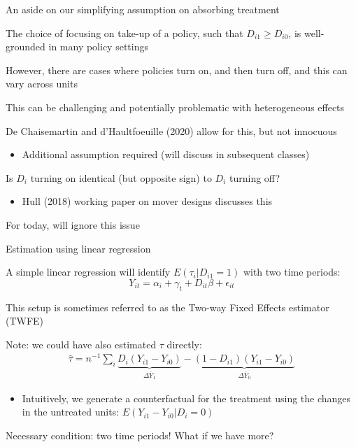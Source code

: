 \documentclass[notes,11pt, aspectratio=169]{beamer}
\newenvironment{wideitemize}{\itemize\addtolength{\itemsep}{10pt}}{\enditemize}
\begin{document}
\begin{frame}{An aside on our simplifying assumption on absorbing treatment}
	\begin{wideitemize}
		\item The choice of focusing on take-up of a policy, such that $D_{i1} \geq D_{i0}$, is well-grounded in many policy settings
		\item However, there are cases where policies turn on, and then turn off, and this can vary across units
		\item This can be challenging and potentially problematic with
		heterogeneous effects
		\item De Chaisemartin and d'Haultfoeuille (2020) allow for this, but not innocuous
		\begin{itemize}
			\item Additional assumption required (will discuss in subsequent classes)
		\end{itemize}
		\item Is $D_{i}$ turning on identical (but opposite sign) to $D_{i}$
		turning off?
		\begin{itemize}
			\item Hull (2018) working paper on mover designs discusses this
		\end{itemize}
		\item For today, will ignore this issue
	\end{wideitemize}
\end{frame}

\begin{frame}{Estimation using linear regression}
	\begin{wideitemize}
		\item A simple linear regression will identify
		$E(\tau_{i} | D_{i1} = 1)$ with two time periods:
		\begin{equation}
			Y_{it} = \alpha_{i}+ \gamma_{t} + D_{it}\beta + \epsilon_{it}
		\end{equation}
		\item This setup is sometimes referred to as the Two-way Fixed Effects estimator (TWFE)
		\item Note: we could have also estimated $\tau$ directly:
		\begin{align*}
			\hat{\tau} = n^{-1}\sum_{i} \underbrace{D_{i}(Y_{i1} - Y_{i0})}_{\Delta \overline{Y}_{1}} - \underbrace{(1-D_{i1})(Y_{i1} - Y_{i0})}_{\Delta \overline{Y}_{0}}
		\end{align*}
		\begin{itemize}
			\item Intuitively, we generate a counterfactual for the treatment
			      using the changes in the untreated units: $E(Y_{i1} - Y_{i0} | D_{i}=0)$
		\end{itemize}
		\item Necessary condition: two time periods! What if we have more?
	\end{wideitemize}
\end{frame}
\end{document}
